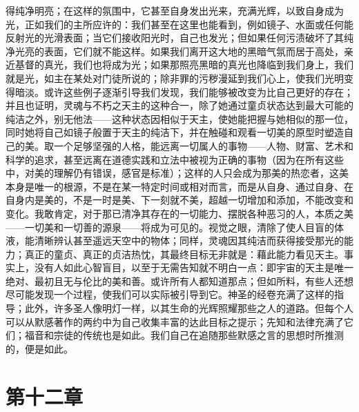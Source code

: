 得纯净明亮；在这样的氛围中，它甚至自身发出光来，充满光辉，以致自身成为光，正如我们的主所应许的：我们甚至在这里也能看到，例如镜子、水面或任何能反射光的光滑表面；当它们接收阳光时，自己也发光；但如果任何污渍破坏了其纯净光亮的表面，它们就不能这样。如果我们离开这大地的黑暗气氛而居于高处，亲近基督的真光，我们也将成为光；如果那照亮黑暗的真光也降临到我们身上，我们就是光，如主在某处对门徒所说的；除非罪的污秽漫延到我们心上，使我们光明变得暗淡。或许这些例子逐渐引导我们发现，我们能够被改变为比自己更好的存在；并且也证明，灵魂与不朽之天主的这种合一，除了她通过童贞状态达到最大可能的纯洁之外，别无他法——这种状态因相似于天主，使她能把握与她相似的那一位，同时她将自己如镜子般置于天主的纯洁下，并在触碰和观看一切美的原型时塑造自己的美。取一个足够坚强的人格，能远离一切属人的事物——人物、财富、艺术和科学的追求，甚至远离在道德实践和立法中被视为正确的事物（因为在所有这些中，对美的理解仍有错误，感官是标准）；这样的人只会成为那美的热恋者，这美本身是唯一的根源，不是在某一特定时间或相对而言，而是从自身、通过自身、在自身内是美的，不是一时是美、下一刻就不美，超越一切增加和添加，不能改变和变化。我敢肯定，对于那已清净其存在的一切能力、摆脱各种恶习的人，本质之美——一切美和一切善的源泉——将成为可见的。视觉之眼，清除了使人目盲的体液，能清晰辨认甚至遥远天空中的物体；同样，灵魂因其纯洁而获得接受那光的能力；真正的童贞、真正的贞洁热忱，其最终目标无非就是：藉此能力看见天主。事实上，没有人如此心智盲目，以至于无需告知就不明白一点：即宇宙的天主是唯一绝对、最初且无与伦比的美和善。或许所有人都知道那点；但如所料，有些人还想尽可能发现一个过程，使我们可以实际被引导到它。神圣的经卷充满了这样的指导；此外，许多圣人像明灯一样，以其生命的光辉照耀那些之人的道路。但每个人可以从默感著作的两约中为自己收集丰富的达此目标之提示；先知和法律充满了它们；福音和宗徒的传统也是如此。我们自己在追随那些默感之言的思想时所推测的，便是如此。\par


\section{第十二章}

